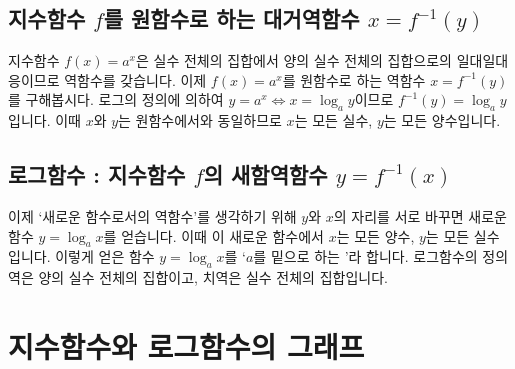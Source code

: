 \subsection{지수함수 $f$를 원함수로 하는 대거역함수 $x=f^{-1}\left(y\right)$}
지수함수 $f\left( x \right) =a^x$은 실수 전체의 집합에서 양의 실수 전체의 집합으로의 일대일대응이므로 역함수를 갖습니다. 이제 $f\left( x \right) =a^x $를 원함수로 하는 역함수 $x = f^{-1}(y)$를 구해봅시다. 로그의 정의에 의하여 $y=a^x \Longleftrightarrow x=\log_a y$이므로 $f^{-1}\left( y \right) = \log_a y$입니다. 이때 $x$와 $y$는 원함수에서와 동일하므로 $x$는 모든 실수, $y$는 모든 양수입니다.

\subsection{로그함수 : 지수함수 $f$의 새함역함수 $y=f^{-1}\left(x\right)$}
이제 `새로운 함수로서의 역함수'를 생각하기 위해 $y$와 $x$의 자리를 서로 바꾸면 새로운 함수 $y=\log_a x$를 얻습니다. 이때 이 새로운 함수에서 $x$는 모든 양수, $y$는 모든 실수입니다.  이렇게 얻은 함수 $y=\log_a x$를 `$a$를 밑으로 하는 '라 합니다. 로그함수의 정의역은 양의 실수 전체의 집합이고, 치역은 실수 전체의 집합입니다.
\clearpage
\section{지수함수와 로그함수의 그래프}

